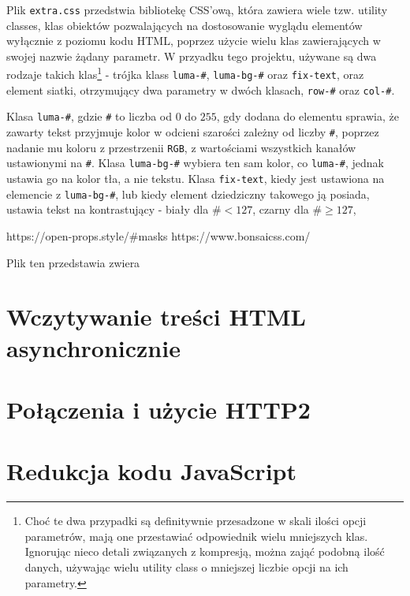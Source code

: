 \documentclass[licencjacka]{pracadypl}
\begin{document}
Plik \texttt{extra.css} przedstwia bibliotekę CSS'ową, która zawiera wiele tzw. utility classes, klas obiektów pozwalających na dostosowanie wyglądu elementów wyłącznie z poziomu kodu HTML, poprzez użycie wielu klas zawierających w swojej nazwie żądany parametr. W przyadku tego projektu, używane są dwa rodzaje takich klas\footnote{Choć te dwa przypadki są definitywnie przesadzone w skali ilości opcji parametrów, mają one przestawiać odpowiednik wielu mniejszych klas. Ignorując nieco detali związanych z kompresją, można zająć podobną ilość danych, używając wielu utility class o mniejszej liczbie opcji na ich parametry.} - trójka klass \texttt{luma-\#}, \texttt{luma-bg-\#} oraz \texttt{fix-text}, oraz element siatki, otrzymujący dwa parametry w dwóch klasach, \texttt{row-\#} oraz \texttt{col-\#}.

Klasa \texttt{luma-\#}, gdzie \texttt{\#} to liczba od $0$ do $255$, gdy dodana do elementu sprawia, że zawarty tekst przyjmuje kolor w odcieni szarości zależny od liczby \texttt{\#}, poprzez nadanie mu koloru z przestrzenii \texttt{RGB}, z wartościami wszystkich kanałów ustawionymi na \texttt{\#}. Klasa \texttt{luma-bg-\#} wybiera ten sam kolor, co \texttt{luma-\#}, jednak ustawia go na kolor tła, a nie tekstu. Klasa \texttt{fix-text}, kiedy jest ustawiona na elemencie z \texttt{luma-bg-\#}, lub kiedy element dziedziczny takowego ją posiada, ustawia tekst na kontrastujący - biały dla $\texttt{\#} < 127$, czarny dla $\texttt{\#} \geq 127$,


https://open-props.style/\#masks
https://www.bonsaicss.com/

Plik ten przedstawia zwiera





\section{Wczytywanie treści HTML asynchronicznie}






\section{Połączenia i użycie HTTP2}






\section{Redukcja kodu JavaScript}
\end{document}
